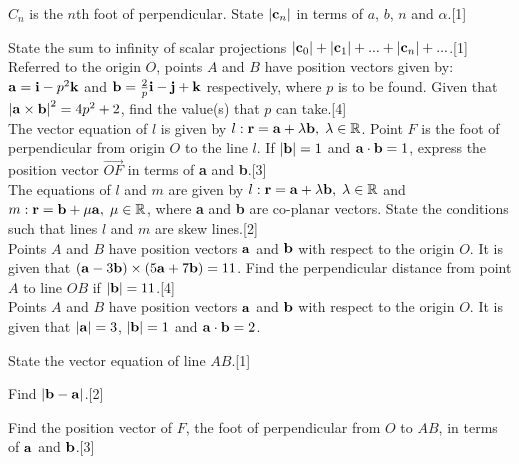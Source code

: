 \documentclass[12pt, a4 paper]{article}
\begin{document}
\begin{outline}[enumerate]
	\2 ${C_n}$ is the $n$th foot of perpendicular. State $\left| {{{\bf{c}}_n}} \right|$ in terms of $a$, $b$, $n$ and $\alpha$.\hfill[1]

	\2 State the sum to infinity of scalar projections $\left| {{{\bf{c}}_0}} \right| + \left| {{{\bf{c}}_1}} \right| + ... + \left| {{{\bf{c}}_n}} \right| + ...$.\hfill[1]\\

	\1 Referred to the origin $O$, points $A$ and $B$ have position vectors given by: ${\bf{a}} = {\bf{i}} - {p^2}{\bf{k}}$ and ${\bf{b}} = \frac{2}{p}{\bf{i}} - {\bf{j}} + {\bf{k}}$ respectively, where $p$ is to be found. Given that ${\left| {{\bf{a}} \times {\bf{b}}} \right|^2} = 4{p^2} + 2$, find the value(s) that $p$ can take.\hfill[4]\\

	\1 The vector equation of $l$ is given by $l:{\bf{r}} = {\bf{a}} + \lambda {\bf{b}},\;\lambda  \in \mathbb{R}$. Point $F$ is the foot of perpendicular from origin $O$ to the line $l$. If $\left| {\bf{b}} \right| = 1$ and ${\bf{a}} \cdot {\bf{b}} = 1$, express the position vector $\overrightarrow {OF}$ in terms of \textbf{a} and \textbf{b}.\hfill[3]\\

	\1 The equations of $l$ and $m$ are given by $l:{\bf{r}} = {\bf{a}} + \lambda {\bf{b}},\;\lambda  \in \mathbb{R}$ and $m:{\bf{r}} = {\bf{b}} + \mu {\bf{a}},\;\mu  \in \mathbb{R}$, where \textbf{a} and \textbf{b} are co-planar vectors. State the conditions such that lines $l$ and $m$ are skew lines.\hfill[2]\\

	\1 Points $A$ and $B$ have position vectors $\bf{a}$ and $\bf{b}$ with respect to the origin $O$. It is given that $({\bf{a}} - 3{\bf{b}}) \times (5{\bf{a}} + 7{\bf{b}}) = 11$. Find the perpendicular distance from point $A$ to line $OB$ if $\left| {\bf{b}} \right| = 11$.\hfill[4]\\

	\1 Points $A$ and $B$ have position vectors $\bf{a}$ and $\bf{b}$ with respect to the origin $O$. It is given that $\left| {\bf{a}} \right| = 3$, $\left| {\bf{b}} \right| = 1$ and ${\bf{a}} \cdot {\bf{b}} = 2$.

	\2 State the vector equation of line $AB$.\hfill[1]

	\2 Find $\left| {{\bf{b}} - {\bf{a}}} \right|$.\hfill[2]

	\2 Find the position vector of $F$, the foot of perpendicular from $O$ to $AB$, in terms of $\bf{a}$ and $\bf{b}$.\hfill[3]


\end{outline}
\end{document}

